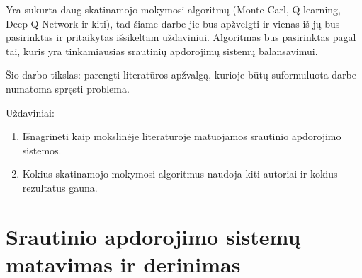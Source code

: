 \documentclass{VUMIFPSbakalaurinis}
\begin{document}
Yra sukurta daug skatinamojo mokymosi algoritmų (Monte Carl, Q-learning, Deep Q Network ir kiti), tad šiame darbe jie bus apžvelgti ir vienas iš jų bus pasirinktas ir pritaikytas išsikeltam uždaviniui. Algoritmas bus pasirinktas pagal tai, kuris yra tinkamiausias srautinių apdorojimų sistemų balansavimui.

Šio darbo tikslas: parengti literatūros apžvalgą, kurioje būtų suformuluota darbe numatoma spręsti problema.

Uždaviniai:
\begin{enumerate}
    \item Išnagrinėti kaip mokslinėje literatūroje matuojamos srautinio apdorojimo sistemos.
    \item Kokius skatinamojo mokymosi algoritmus naudoja kiti autoriai ir kokius rezultatus gauna. 
\end{enumerate}

\section{Srautinio apdorojimo sistemų matavimas ir derinimas}
\end{document}

